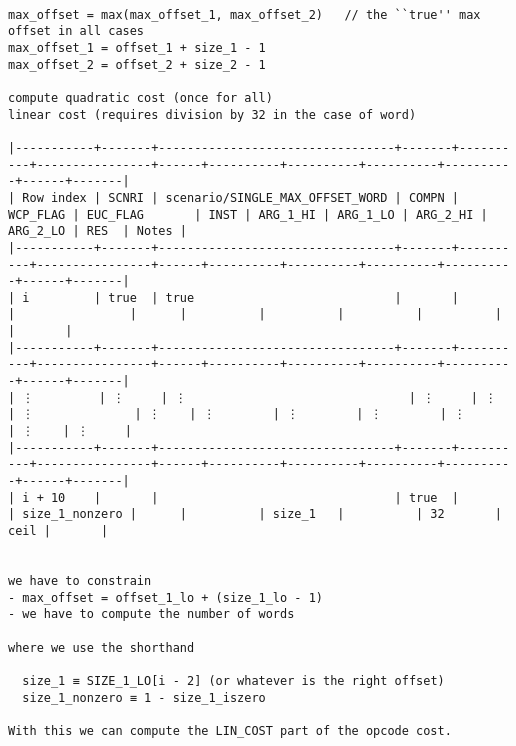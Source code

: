 \documentclass[varwidth=\maxdimen,margin=0.5cm,multi={verbatim}]{standalone}
\begin{document}
\begin{verbatim}

max_offset = max(max_offset_1, max_offset_2)   // the ``true'' max offset in all cases
max_offset_1 = offset_1 + size_1 - 1
max_offset_2 = offset_2 + size_2 - 1

compute quadratic cost (once for all)
linear cost (requires division by 32 in the case of word)

|-----------+-------+---------------------------------+-------+----------+----------------+------+----------+----------+----------+----------+------+-------|
| Row index | SCNRI | scenario/SINGLE_MAX_OFFSET_WORD | COMPN | WCP_FLAG | EUC_FLAG       | INST | ARG_1_HI | ARG_1_LO | ARG_2_HI | ARG_2_LO | RES  | Notes |
|-----------+-------+---------------------------------+-------+----------+----------------+------+----------+----------+----------+----------+------+-------|
| i         | true  | true                            |       |          |                |      |          |          |          |          |      |       |
|-----------+-------+---------------------------------+-------+----------+----------------+------+----------+----------+----------+----------+------+-------|
| ⋮         | ⋮     | ⋮                               | ⋮     | ⋮        | ⋮              | ⋮    | ⋮        | ⋮        | ⋮        | ⋮        | ⋮    | ⋮     |
|-----------+-------+---------------------------------+-------+----------+----------------+------+----------+----------+----------+----------+------+-------|
| i + 10    |       |                                 | true  |          | size_1_nonzero |      |          | size_1   |          | 32       | ceil |       |
     

we have to constrain
- max_offset = offset_1_lo + (size_1_lo - 1)
- we have to compute the number of words

where we use the shorthand

  size_1 ≡ SIZE_1_LO[i - 2] (or whatever is the right offset)
  size_1_nonzero ≡ 1 - size_1_iszero

With this we can compute the LIN_COST part of the opcode cost.



\end{verbatim}
\end{document}

